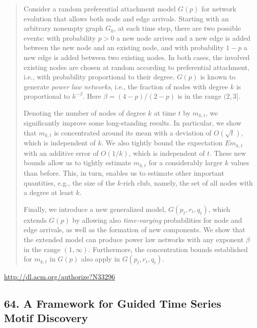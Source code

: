 \documentclass{article}
\begin{document}
\begin{quote}
Consider a random preferential attachment model $G(p)$ for network evolution that allows both node and edge arrivals. Starting with an arbitrary nonempty graph $G_0$, at each time step, there are two possible events: with probability $p>0$ a new node arrives and a new edge is added between the new node and an existing node, and with probability $1-p$ a new edge is added between two existing nodes. In both cases, the involved existing nodes are chosen at random according to preferential attachment, i.e., with probability proportional to their degree. $G(p)$ is known to generate {\em power law networks}, i.e., the fraction of nodes with degree $k$ is proportional to $k^{-\beta}$. Here $\beta=(4-p)/(2-p)$ is in the range $(2,3]$.







  Denoting the number of nodes of degree $k$ at time $t$ by $m_{k,t}$, we significantly improve some long-standing results. In particular, we show that $m_{k,t}$ is concentrated around its mean with a deviation of $O(\sqrt{t})$, which is independent of $k$. We also tightly bound the expectation $E{m_{k,t}}$ with an additive error of $O(1/k)$, which is independent of $t$. These new bounds allow us to tightly estimate $m_{k,t}$ for a considerably larger $k$ values than before. This, in turn, enables us to estimate other important quantities, e.g., the size of the $k$-rich club, namely, the set of all nodes with a degree at least $k$.







  Finally, we introduce a new generalized model, $G(p_t, r_t, q_t)$, which extends $G(p)$ by allowing also \emph{time-varying} probabilities for node and edge arrivals, as well as the formation of new components. We show that the extended model can produce power law networks with any exponent $\beta$ in the range $(1,\infty)$. Furthermore, the concentration bounds established for $m_{k,t}$ in $G(p)$ also apply in $G(p_t, r_t, q_t)$.
\end{quote}

\href{http://dl.acm.org/authorize?N33296}{http://dl.acm.org/authorize?N33296}

\subsection{64. A Framework for Guided Time Series Motif Discovery}
\end{document}

